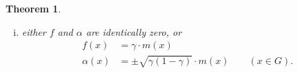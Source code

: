\documentclass[a4paper,12pt]{article}
\theoremstyle{plain}
\newtheorem{thm}{Theorem}
\theoremstyle{definition}
\theoremstyle{remark}
\begin{document}
\begin{thm}
\begin{enumerate}[(i)]
\begin{align*}
   \alpha(x)&= \alpha_{1}\cdot m_{1}(x)+\alpha_{2}\cdot m_{2}(x)
   \qquad (x\in G), 
  \end{align*}
where the constants $\alpha_{1}, \alpha_2, \gamma_{1}$ and $\gamma_{2}$ satisfy the system of equation
\begin{align*}
 \gamma_{1}^{2}+\alpha_{1}^2&=\gamma_{1}\\
 \gamma_{2}^{2}+\alpha_{2}^2&=\gamma_{2}\\
 \gamma_{1}\gamma_{2}+\alpha_{1}\alpha_{2}&= 0. 
 \end{align*}
 \item either $f$ and $\alpha$ are identically zero, or 
  \begin{align*}
 f(x)&= \gamma \cdot m(x)\\
 \alpha(x)&= \pm\sqrt{\gamma(1-\gamma)}\cdot m(x)
 \qquad 
 \left(x\in G\right). 
 \end{align*}
 \end{enumerate}
\end{thm}
\end{document}
